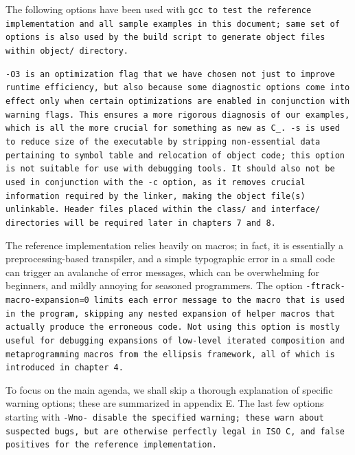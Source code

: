 The following options have been used with \tt{gcc} to test the
reference implementation and all sample examples in this document;
same set of options is also used by the build script
to generate object files within \tt{object/} directory.


\tt{-O3} is an optimization flag that we have chosen not just to improve
runtime efficiency, but also because some diagnostic options come into effect
only when certain optimizations are enabled in conjunction with warning flags.
This ensures a more rigorous diagnosis of our examples,
which is all the more crucial for something as new as C\_.
\tt{-s} is used to reduce size of the executable by stripping non-essential
data pertaining to symbol table and relocation of object code;
this option is not suitable for use with debugging tools.
It should also not be used in conjunction with the \tt{-c} option,
as it removes crucial information required by the linker,
making the object file(s) unlinkable.
Header files placed within the \tt{class/} and \tt{interface/}
directories will be required later in chapters 7 and 8.

The reference implementation relies heavily on macros;
in fact, it is essentially a preprocessing-based transpiler,
and a simple typographic error in a small code can trigger an
avalanche of error messages, which can be overwhelming for beginners,
and mildly annoying for seasoned programmers.
The option \tt{-ftrack-macro-expansion=0} limits each error message to the
macro that is used in the program, skipping any nested expansion of helper
macros that actually produce the erroneous code.
Not using this option is mostly useful for debugging expansions
of low-level iterated composition and metaprogramming macros from
the ellipsis framework, all of which is introduced in chapter 4.

To focus on the main agenda, we shall skip a thorough explanation
of specific warning options; these are summarized in appendix E.
The last few options starting with \tt{-Wno-} disable the specified
warning; these warn about suspected bugs, but are otherwise perfectly
legal in ISO C, and false positives for the reference implementation.
